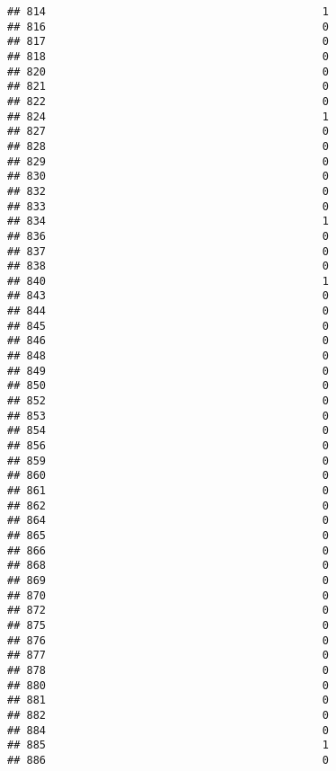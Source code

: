 \documentclass[
]{article}
\begin{document}
\begin{verbatim}
## 814                                           1
## 816                                           0
## 817                                           0
## 818                                           0
## 820                                           0
## 821                                           0
## 822                                           0
## 824                                           1
## 827                                           0
## 828                                           0
## 829                                           0
## 830                                           0
## 832                                           0
## 833                                           0
## 834                                           1
## 836                                           0
## 837                                           0
## 838                                           0
## 840                                           1
## 843                                           0
## 844                                           0
## 845                                           0
## 846                                           0
## 848                                           0
## 849                                           0
## 850                                           0
## 852                                           0
## 853                                           0
## 854                                           0
## 856                                           0
## 859                                           0
## 860                                           0
## 861                                           0
## 862                                           0
## 864                                           0
## 865                                           0
## 866                                           0
## 868                                           0
## 869                                           0
## 870                                           0
## 872                                           0
## 875                                           0
## 876                                           0
## 877                                           0
## 878                                           0
## 880                                           0
## 881                                           0
## 882                                           0
## 884                                           0
## 885                                           1
## 886                                           0

\end{verbatim}
\end{document}
